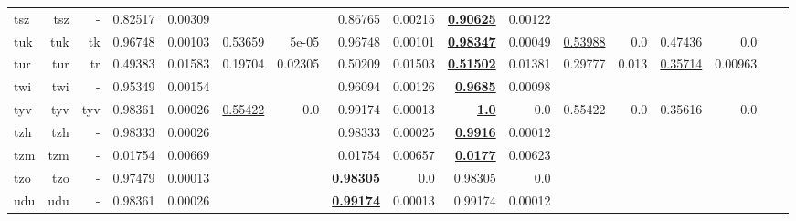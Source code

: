 \documentclass[11pt]{article}
\begin{document}
\begin{table*}[h]
{\begin{tabular}{lrrrrrrrrrrrrrrrr}
tsz         & tsz         & -         & 0.82517         & 0.00309         &          &          & 0.86765         & 0.00215         & \textbf{\underline{0.90625}}         & 0.00122         &          &          &          &          \\
tuk         & tuk         & tk         & 0.96748         & 0.00103         & 0.53659         & 5e-05         & 0.96748         & 0.00101         & \textbf{\underline{0.98347}}         & 0.00049         & \underline{0.53988}         & 0.0         & 0.47436         & 0.0         \\
tur         & tur         & tr         & 0.49383         & 0.01583         & 0.19704         & 0.02305         & 0.50209         & 0.01503         & \textbf{\underline{0.51502}}         & 0.01381         & 0.29777         & 0.013         & \underline{0.35714}         & 0.00963         \\
twi         & twi         & -         & 0.95349         & 0.00154         &          &          & 0.96094         & 0.00126         & \textbf{\underline{0.9685}}         & 0.00098         &          &          &          &          \\
tyv         & tyv         & tyv         & 0.98361         & 0.00026         & \underline{0.55422}         & 0.0         & 0.99174         & 0.00013         & \textbf{\underline{1.0}}         & 0.0         & 0.55422         & 0.0         & 0.35616         & 0.0         \\
tzh         & tzh         & -         & 0.98333         & 0.00026         &          &          & 0.98333         & 0.00025         & \textbf{\underline{0.9916}}         & 0.00012         &          &          &          &          \\
tzm         & tzm         & -         & 0.01754         & 0.00669         &          &          & 0.01754         & 0.00657         & \textbf{\underline{0.0177}}         & 0.00623         &          &          &          &          \\
tzo         & tzo         & -         & 0.97479         & 0.00013         &          &          & \textbf{\underline{0.98305}}         & 0.0         & 0.98305         & 0.0         &          &          &          &          \\
udu         & udu         & -         & 0.98361         & 0.00026         &          &          & \textbf{\underline{0.99174}}         & 0.00013         & 0.99174         & 0.00012         &          &          &          &          \\

\end{tabular}}
\end{table*}
\end{document}
